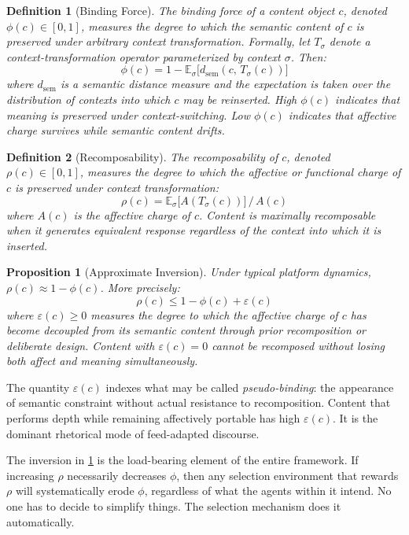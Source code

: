 \documentclass[12pt]{article}
\newtheorem{proposition}{Proposition}[section]
\newtheorem{definition}{Definition}[section]
\newcommand{\bind}{\phi}
\newcommand{\recomp}{\rho}
\newcommand{\dsem}{d_{\mathrm{sem}}}
\begin{document}
\begin{definition}[Binding Force]
\label{def:binding}
The binding force of a content object $c$, denoted $\bind(c) \in [0,1]$,
measures the degree to which the semantic content of $c$ is preserved under
arbitrary context transformation. Formally, let $T_\sigma$ denote a
context-transformation operator parameterized by context $\sigma$. Then:
\[
\bind(c) = 1 - \mathbb{E}_\sigma\bigl[\dsem(c,\, T_\sigma(c))\bigr]
\]
where $\dsem$ is a semantic distance measure and the expectation is taken
over the distribution of contexts into which $c$ may be reinserted.
High $\bind(c)$ indicates that meaning is preserved under context-switching.
Low $\bind(c)$ indicates that affective charge survives while semantic content
drifts.
\end{definition}

\begin{definition}[Recomposability]
\label{def:recomp}
The recomposability of $c$, denoted $\recomp(c) \in [0,1]$, measures the
degree to which the affective or functional charge of $c$ is preserved under
context transformation:
\[
\recomp(c) = \mathbb{E}_\sigma\bigl[A(T_\sigma(c))\bigr] \,/\, A(c)
\]
where $A(c)$ is the affective charge of $c$. Content is maximally
recomposable when it generates equivalent response regardless of the
context into which it is inserted.
\end{definition}

\begin{proposition}[Approximate Inversion]
\label{prop:inversion}
Under typical platform dynamics, $\recomp(c) \approx 1 - \bind(c)$. More
precisely:
\[
\recomp(c) \leq 1 - \bind(c) + \varepsilon(c)
\]
where $\varepsilon(c) \geq 0$ measures the degree to which the affective
charge of $c$ has become decoupled from its semantic content through prior
recomposition or deliberate design. Content with $\varepsilon(c) = 0$ cannot
be recomposed without losing both affect and meaning simultaneously.
\end{proposition}

The quantity $\varepsilon(c)$ indexes what may be called \emph{pseudo-binding}:
the appearance of semantic constraint without actual resistance to
recomposition. Content that performs depth while remaining affectively
portable has high $\varepsilon(c)$. It is the dominant rhetorical mode of
feed-adapted discourse.

The inversion in \cref{prop:inversion} is the load-bearing element of the
entire framework. If increasing $\recomp$ necessarily decreases $\bind$,
then any selection environment that rewards $\recomp$ will systematically
erode $\bind$, regardless of what the agents within it intend. No one has to
decide to simplify things. The selection mechanism does it automatically.
\end{document}
